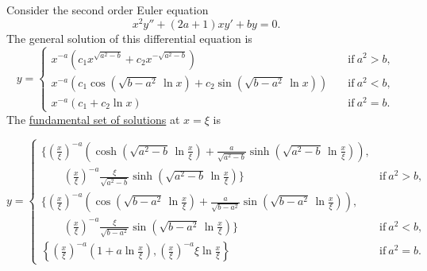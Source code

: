\begin{Result}
  Consider the second order Euler equation
  \[
  x^2 y'' + (2 a + 1) x y' + b y = 0.
  \]
  The general solution of this differential equation is
  \[
  y = 
  \begin{cases}
    x^{-a} \left( c_1 x^{\sqrt{a^2 - b}} 
      + c_2 x^{- \sqrt{a^2 - b}} \right)
    \quad &\mathrm{if}\ a^2 > b, \\
    x^{-a} \left( c_1 \cos \left( \sqrt{b - a^2}\, \ln x \right)  
      + c_2 \sin \left( \sqrt{b - a^2}\, \ln x \right) \right)
    \quad &\mathrm{if}\ a^2 < b, \\
    x^{-a} \left( c_1 + c_2 \ln x \right)
    \quad &\mathrm{if}\ a^2 = b. 
  \end{cases}
  \]
  The 
  \hyperref[section The Fundamental Set of Solutions]
  {fundamental set of solutions}
  at $x = \xi$ is
  \begin{normalsize}
    \[
    y = 
    \begin{cases}
      \Big\{ \left( \frac{x}{\xi} \right)^{-a} 
      \left( \cosh \left( \sqrt{a^2 - b}\, \ln \frac{x}{\xi} \right) 
        + \frac{a}{\sqrt{a^2 - b}} 
        \sinh \left( \sqrt{a^2 - b}\, \ln \frac{x}{\xi} \right) \right), & \\
      \qquad \left( \frac{x}{\xi} \right)^{-a} 
      \frac{\xi}{\sqrt{a^2 - b}}
      \sinh \left( \sqrt{a^2 - b}\, \ln \frac{x}{\xi} \right) 
      \Big\}
      \quad &\mathrm{if}\ a^2 > b, \\
      \Big\{ \left( \frac{x}{\xi} \right)^{-a} 
      \left( \cos \left( \sqrt{b - a^2}\, \ln \frac{x}{\xi} \right) 
        + \frac{a}{\sqrt{b - a^2}} 
        \sin \left( \sqrt{b - a^2}\, \ln \frac{x}{\xi} \right) \right), & \\
      \qquad \left( \frac{x}{\xi} \right)^{-a} 
      \frac{\xi}{\sqrt{b - a^2}}
      \sin \left( \sqrt{b - a^2}\, \ln \frac{x}{\xi} \right) 
      \Big\}
      \quad &\mathrm{if}\ a^2 < b, \\
      \left\{ \left( \frac{x}{\xi} \right)^{-a} \left( 1 
          + a \ln \frac{x}{\xi} \right),
        \left( \frac{x}{\xi} \right)^{-a} \xi \ln \frac{x}{\xi} \right\}
      \quad &\mathrm{if}\ a^2 = b. 
    \end{cases}
    \]
  \end{normalsize}
\end{Result}






